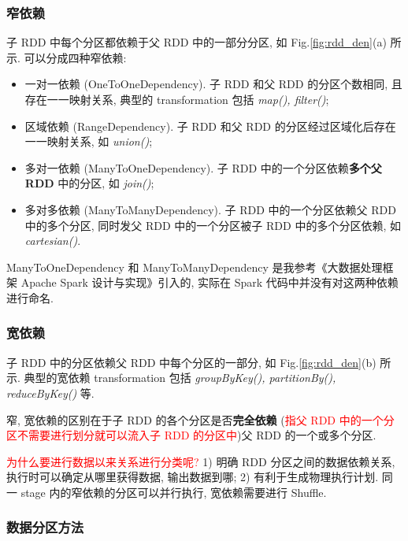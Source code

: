 \subsubsection{窄依赖}

子 RDD 中每个分区都依赖于父 RDD 中的一部分分区, 如 Fig.\ref{fig:rdd_den}(a) 所示. 可以分成四种窄依赖:

\begin{itemize}
	\item 一对一依赖 (OneToOneDependency). 子 RDD 和父 RDD 的分区个数相同, 且存在一一映射关系, 典型的 transformation 包括 \textit{map(), filter()};
	
	\item 区域依赖 (RangeDependency). 子 RDD 和父 RDD 的分区经过区域化后存在一一映射关系, 如 \textit{union()};
	
	\item 多对一依赖 (ManyToOneDependency). 子 RDD 中的一个分区依赖\textbf{多个父 RDD} 中的分区, 如 \textit{join()};
	
	\item 多对多依赖 (ManyToManyDependency). 子 RDD 中的一个分区依赖父 RDD 中的多个分区, 同时发父 RDD 中的一个分区被子 RDD 中的多个分区依赖, 如 \textit{cartesian()}.
\end{itemize}

ManyToOneDependency 和 ManyToManyDependency 是我参考《大数据处理框架 Apache Spark 设计与实现》引入的, 实际在 Spark 代码中并没有对这两种依赖进行命名.

\subsubsection{宽依赖}

子 RDD 中的分区依赖父 RDD 中每个分区的一部分, 如 Fig.\ref{fig:rdd_den}(b) 所示. 典型的宽依赖 transformation 包括 \textit{groupByKey(), partitionBy(), reduceByKey()} 等.

窄, 宽依赖的区别在于子 RDD 的各个分区是否\textbf{完全依赖} (\textcolor{red}{指父 RDD 中的一个分区不需要进行划分就可以流入子 RDD 的分区中})父 RDD 的一个或多个分区. 

\textcolor{red}{为什么要进行数据以来关系进行分类呢?} 1) 明确 RDD 分区之间的数据依赖关系, 执行时可以确定从哪里获得数据, 输出数据到哪; 2) 有利于生成物理执行计划. 同一 stage 内的窄依赖的分区可以并行执行, 宽依赖需要进行 Shuffle. 

\subsubsection{数据分区方法}

